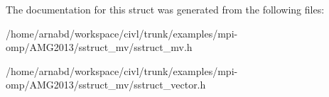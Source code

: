 The documentation for this struct was generated from the following files\+:\begin{DoxyCompactItemize}
\item 
/home/arnabd/workspace/civl/trunk/examples/mpi-\/omp/\+A\+M\+G2013/sstruct\+\_\+mv/sstruct\+\_\+mv.\+h\item 
/home/arnabd/workspace/civl/trunk/examples/mpi-\/omp/\+A\+M\+G2013/sstruct\+\_\+mv/sstruct\+\_\+vector.\+h\end{DoxyCompactItemize}
